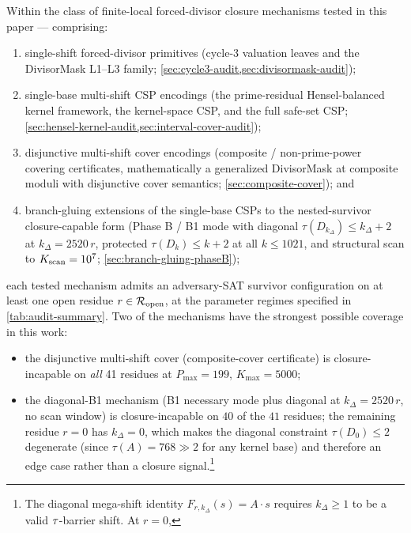 \begin{theorem}
\label{thm:audit-chain-closeout}
Within the class of finite-local forced-divisor closure mechanisms
tested in this paper --- comprising:
\begin{enumerate}[leftmargin=*, label=(\roman*)]
\item single-shift forced-divisor primitives (cycle-3 valuation
  leaves and the DivisorMask L1--L3 family;
  \cref{sec:cycle3-audit,sec:divisormask-audit});
\item single-base multi-shift CSP encodings (the prime-residual
  Hensel-balanced kernel framework, the kernel-space CSP, and the
  full safe-set CSP;
  \cref{sec:hensel-kernel-audit,sec:interval-cover-audit});
\item disjunctive multi-shift cover encodings (composite /
  non-prime-power covering certificates, mathematically a
  generalized DivisorMask at composite moduli with disjunctive cover
  semantics; \cref{sec:composite-cover}); and
\item branch-gluing extensions of the single-base CSPs to the
  nested-survivor closure-capable form (Phase B / B1 mode with
  diagonal $\tau(D_{k_\Delta}) \le k_\Delta + 2$ at
  $k_\Delta = 2520\, r$, protected $\tau(D_k) \le k + 2$ at all
  $k \le 1021$, and structural scan to $K_{\rm scan} = 10^7$;
  \cref{sec:branch-gluing-phaseB});
\end{enumerate}
each tested mechanism admits an adversary-SAT survivor configuration
on at least one open residue $r \in \mathcal{R}_{\mathrm{open}}$, at the parameter
regimes specified in \cref{tab:audit-summary}. Two of the mechanisms
have the strongest possible coverage in this work:
\begin{itemize}[leftmargin=*]
\item the disjunctive multi-shift cover (composite-cover certificate)
  is closure-incapable on \emph{all} 41 residues at
  $P_{\max} = 199$, $K_{\max} = 5000$;
\item the diagonal-B1 mechanism (B1 necessary mode plus diagonal at
  $k_\Delta = 2520\,r$, no scan window) is closure-incapable on $40$ of
  the $41$ residues; the remaining residue $r = 0$ has $k_\Delta = 0$,
  which makes the diagonal constraint $\tau(D_0) \le 2$ degenerate
  (since $\tau(A) = 768 \gg 2$ for any kernel base) and therefore an
  edge case rather than a closure signal.\footnote{The diagonal
  mega-shift identity $F_{r, k_\Delta}(s) = A \cdot s$ requires
  $k_\Delta \ge 1$ to be a valid $\tau$-barrier shift. At $r = 0$,
}
\end{itemize}
\end{theorem}
